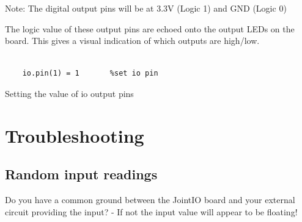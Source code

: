\documentclass[a4paper, 12pt]{article}
\begin{document}
Note: The digital output pins will be at 3.3V (Logic 1) and GND (Logic 0)


The logic value of these output pins are echoed onto the output LEDs on the board. This gives a visual indication of which outputs are high/low.

\begin{python}
\begin{verbatim}

	io.pin(1) = 1		%set io pin 

\end{verbatim}
  \caption{Setting the value of io output pins} 
\end{python}

\section{Troubleshooting}
\subsection{Random input readings}
Do you have a common ground between the JointIO board and your external circuit providing the input? - If not the input value will appear to be floating!
\end{document}
